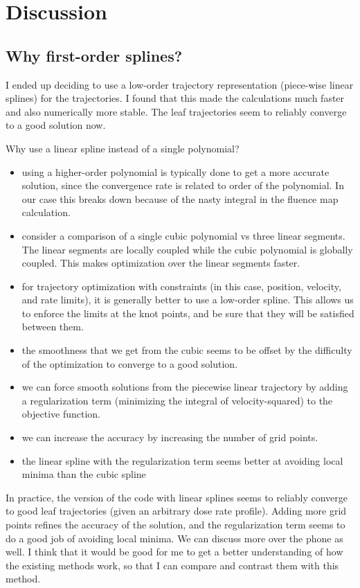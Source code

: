 \section{Discussion}

\subsection{Why first-order splines?}

I ended up deciding to use a low-order trajectory representation (piece-wise linear splines) for the trajectories.
I found that this made the calculations much faster and also numerically more stable.
The leaf trajectories seem to reliably converge to a good solution now.

Why use a linear spline instead of a single polynomial?
\begin{itemize}
  \item using a higher-order polynomial is typically done to get a more accurate solution,
      since the convergence rate is related to order of the polynomial. In our case this breaks down because of the nasty integral in the fluence map calculation.
  \item consider a comparison of a single cubic polynomial vs three linear segments.
      The linear segments are locally coupled while the cubic polynomial is globally coupled.
      This makes optimization over the linear segments faster.
  \item for trajectory optimization with constraints (in this case, position, velocity, and rate limits),
      it is generally better to use a low-order spline.
      This allows us to enforce the limits at the knot points, and be sure that they will be satisfied between them.
  \item the smoothness that we get from the cubic seems to be offset by the difficulty of the
      optimization to converge to a good solution.
  \item we can force smooth solutions from the piecewise linear trajectory by adding a
      regularization term (minimizing the integral of velocity-squared) to the objective function.
  \item we can increase the accuracy by increasing the number of grid points.
  \item the linear spline with the regularization term seems better at avoiding local minima than the cubic spline
\end{itemize}

In practice, the version of the code with linear splines seems to reliably converge to good leaf trajectories (given an arbitrary dose rate profile). Adding more grid points refines the accuracy of the solution, and the regularization term seems to do a good job of avoiding local minima. We can discuss more over the phone as well. I think that it would be good for me to get a better understanding of how the existing methods work, so that I can compare and contrast them with this method.

